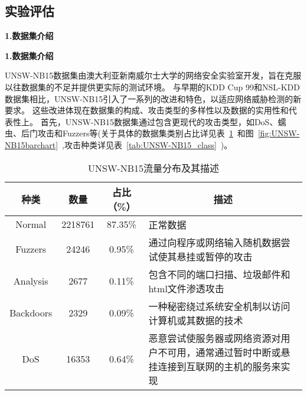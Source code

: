 \subsection{实验评估}
\textbf{1.数据集介绍}\par
\textbf{1.数据集介绍}\par
UNSW-NB15数据集\cite{moustafa2015comprehensive}由澳大利亚新南威尔士大学的网络安全实验室开发，旨在克服以往数据集的不足并提供更实际的测试环境。
与早期的KDD Cup 99和NSL-KDD数据集相比，UNSW-NB15引入了一系列的改进和特色，以适应网络威胁检测的新要求。
这些改进体现在数据集的构成、攻击类型的多样性以及数据的实用性和代表性上。
首先，UNSW-NB15数据集通过包含更现代的攻击类型，如DoS、蠕虫、后门攻击和Fuzzers等(关于具体的数据集类别占比详见表~\ref{tab:UNSW-NB15_distribution}~和图~\ref{fig:UNSW-NB15barchart}~,攻击种类详见表~\ref{tab:UNSW-NB15_class}~)。
\begin{table}[h]
	\caption{UNSW-NB15流量分布及其描述}
	\label{tab:UNSW-NB15_distribution}
	\begin{tabularx}{\textwidth}{@{}cccX@{}}
		\toprule
		\multicolumn{1}{c}{\textbf{种类}} & \multicolumn{1}{c}{\textbf{数量}} & \multicolumn{1}{c}{\textbf{占比（\%）}} & \multicolumn{1}{c}{\textbf{描述}}                                                                \\
		\midrule
		Normal                            & 2218761                           & 87.35\%                                 & 正常数据                                                                                         \\

		Fuzzers                           & 24246                             & 0.95\%                                  & 通过向程序或网络输入随机数据尝试使其悬挂或暂停的攻击                                             \\

		Analysis                          & 2677                              & 0.11\%                                  & 包含不同的端口扫描、垃圾邮件和html文件渗透攻击                                                   \\

		Backdoors                         & 2329                              & 0.09\%                                  & 一种秘密绕过系统安全机制以访问计算机或其数据的技术                                               \\

		DoS                               & 16353                             & 0.64\%                                  & 恶意尝试使服务器或网络资源对用户不可用，通常通过暂时中断或悬挂连接到互联网的主机的服务来实现     \\


\end{tabularx}
\end{table}
